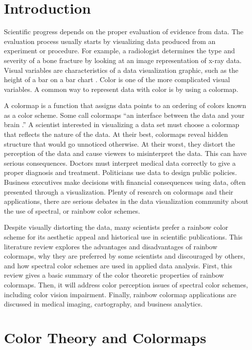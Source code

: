 \documentclass[journal]{IEEEtran}
\begin{document}
\section{Introduction}
Scientific progress depends on the proper evaluation
of evidence from data. The evaluation process usually
starts by visualizing data produced from an experiment
or procedure. For example, a radiologist determines the
type and severity of a bone fracture by looking at an
image representation of x-ray data. Visual variables are
characteristics of a data visualization graphic, such as
the height of a bar on a bar chart 
\cite{visvars, colorchoice, colorguidelines}.
Color is one of the more complicated visual variables. 
A common way to represent data with color is by using a colormap.
\par
A colormap is a function that assigns data points to
an ordering of colors known as a color scheme. Some
call colormaps “an interface between the data and your
brain \cite{viridis}.” A scientist interested in visualizing a
data set must choose a colormap that reflects the nature of the data. 
At their best, colormaps reveal hidden structure that would go unnoticed otherwise. At their worst, they distort the perception of the data and
cause viewers to misinterpret the data. This can have
serious consequences. Doctors must interpret medical
data correctly to give a proper diagnosis and treatment.
Politicians use data to design public policies. Business
executives make decisions with financial consequences using data, often presented through a visualization.
Plenty of research on colormaps and
their applications, there are serious debates in the data
visualization community about the use of spectral, or
rainbow color schemes.
\par
Despite visually distorting the data, many scientists
prefer a rainbow color scheme for its aesthetic appeal
and historical use in scientific publications. This literature review explores the advantages and disadvantages
of rainbow colormaps, why they are preferred by some
scientists and discouraged by others, and how spectral color schemes are used
in applied data analysis. First, this review gives a basic summary 
of the color theoretic properties of rainbow colormaps. Then, it will address color perception issues of spectral color schemes, including color vision impairment. Finally, rainbow colormap applications are discussed in medical imaging, cartography, and business analytics.


\section{Color Theory and Colormaps}
\end{document}
